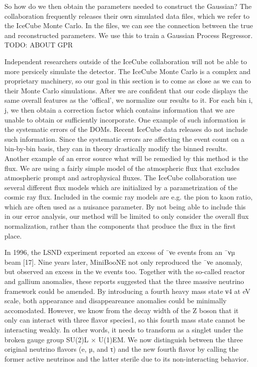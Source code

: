 \documentclass{article}
\begin{document}
So how do we then obtain the parameters needed to construct the Gaussian?
The collaboration frequently releases their own simulated data files, which we refer to the IceCube Monte Carlo.
In the files, we can see the connection between the true and reconstructed parameters. We use this to train a Gaussian
Process Regressor.
TODO: ABOUT GPR

Independent researchers outside of the IceCube collaboration will not be able to more persicely simulate
the detector. The IceCube Monte Carlo is a complex and proprietary machinery, so our goal in this
section is to come as close as we can to their Monte Carlo simulations. After we are confident that our
code displays the same overall features as the ‘offical’, we normalize our results to it.
For each bin i, j, we then obtain a correction factor which contains information that we are unable to
obtain or sufficiently incorporate. One example of such information is the systematic errors of the DOMs.
Recent IceCube data releases do not include such information. Since the systematic errors are affecting
the event count on a bin-by-bin basis, they can in theory drastically modify the binned results. Another
example of an error source what will be remedied by this method is the flux. We are using a fairly simple
model of the atmospheric flux that excludes atmospheric prompt and astrophysical fluxes. The IceCube
collaboration use several different flux models which are initialized by a parametrization of the cosmic
ray flux. Included in the cosmic ray models are e.g. the pion to kaon ratio, which are often used as a nuisance parameter. By not
being able to include this in our error analysis, our method will be limited to only consider the overall flux normalization,
rather than the components that produce the flux in the first place.

In 1996, the LSND experiment reported an excess of ¯νe events from an ¯νµ beam [17]. Nine years later,
MiniBooNE not only reproduced the ¯νe anomaly, but observed an excess in the νe events too. Together
with the so-called reactor and gallium anomalies, these reports suggested that the three massive neutrino
framework could be amended.
By introducing a fourth heavy mass state ν4 at eV scale, both appearance and
disappeareance anomalies could be minimally accomodated. However, we know from the decay width
of the Z boson that it only can interact with three flavor species1, so this fourth mass state cannot be
interacting weakly. In other words, it needs to transform as a singlet under the broken gauge group
SU(2)L × U(1)EM. We now distinguish between the three original neutrino flavors (e, µ, and τ) and the
new fourth flavor by calling the former active neutrinos and the latter sterile due to its non-interacting
behavior.
\end{document}
